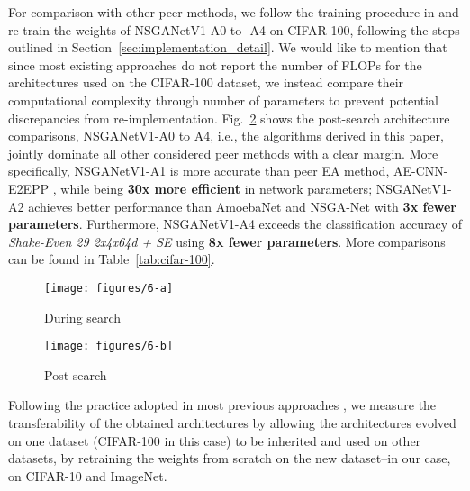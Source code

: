 \documentclass[journal]{IEEEtran}
\def\ourmethod{NSGANetV1}
\theoremstyle{definition}
\theoremstyle{remark}
\begin{document}
{For comparison with other peer methods, we follow the training procedure in \cite{liu2018darts} and re-train the weights of \ourmethod{}-A0 to -A4 on CIFAR-100, following the steps outlined in Section~\ref{sec:implementation_detail}}. We would like to mention that since most existing approaches do not report the number of FLOPs for the architectures used on the CIFAR-100 dataset, we instead compare their computational complexity through number of parameters to prevent potential discrepancies from re-implementation. Fig.~\ref{fig:cifar100} shows the post-search architecture comparisons, \ourmethod{}-A0 to A4, i.e., the algorithms derived in this paper, jointly dominate all other considered peer methods with a clear margin. More specifically, \ourmethod{}-A1 is more accurate than peer EA method, AE-CNN-E2EPP \cite{ae-cnn-e2epp}, while being {\textbf{30x more efficient}} in network parameters; {\ourmethod{}-A2 achieves better performance than AmoebaNet \cite{real2019regularized} and NSGA-Net \cite{lu2019nsga} with \textbf{3x fewer parameters}}. Furthermore, \ourmethod{}-A4 exceeds the classification accuracy of \emph{Shake-Even 29 2x4x64d + SE} \cite{hu2018squeeze} using {\textbf{8x fewer parameters}}. More comparisons can be found in Table~\ref{tab:cifar-100}.

\begin{figure*}[t]
	\centering
	\begin{subfigure}[t]{.48\textwidth}
		\centering
		\texttt{[image: figures/6-a]}
		\caption{During search\label{fig:nsganet_nd_frontier}}
	\end{subfigure} \hfill
	\begin{subfigure}[t]{.48\textwidth}
		\centering
		\texttt{[image: figures/6-b]}
		\caption{Post search\label{fig:cifar100}}
	\end{subfigure}
	\caption{(a) Accuracy vs. FLOPs of all architectures generated by \ourmethod{} during the course of evolution on CIFAR-100. A subset of non-dominated architectures (see text), named \ourmethod{}-A0 to A4, are re-trained thoroughly and compared with other peer methods in (b).
	\label{fig:overall_results}}
	\vspace{-1em}
\end{figure*}



Following the practice adopted in most previous approaches \cite{nasnet2018,real2019regularized,liu2018darts,pmlr-v80-pham18a,liu2018progressive}, we measure the transferability of the obtained architectures by allowing the architectures evolved on one dataset (CIFAR-100 in this case) to be inherited and used on other datasets, by retraining the weights from scratch on the new dataset--in our case, on CIFAR-10 and ImageNet.
\end{document}
